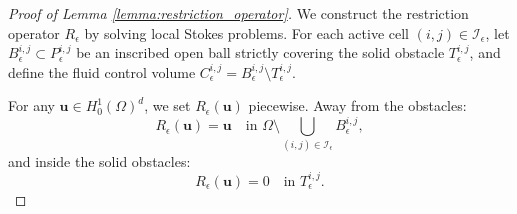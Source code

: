 \documentclass{elsarticle}
\begin{document}
\begin{proof}[Proof of Lemma \ref{lemma:restriction_operator}]
    We construct the restriction operator $R_{\epsilon}$ by solving local Stokes problems. For each active cell $(i,j) \in \mathcal{I}_{\epsilon}$, let $B_{\epsilon}^{i,j} \subset P_\epsilon^{i,j}$ be an inscribed open ball strictly covering the solid obstacle $T_{\epsilon}^{i,j}$, and define the fluid control volume $C_{\epsilon}^{i,j} = B_{\epsilon}^{i,j} \setminus T_{\epsilon}^{i,j}$.

    For any $\mathbf{u} \in H_0^1(\Omega)^d$, we set $R_{\epsilon}(\mathbf{u})$ piecewise. Away from the obstacles:
    \begin{equation}
        R_{\epsilon}(\mathbf{u}) = \mathbf{u} \quad \text{in } \Omega \setminus \bigcup_{(i,j) \in \mathcal{I}_{\epsilon}} B_{\epsilon}^{i,j},
    \end{equation}
    and inside the solid obstacles:
    \begin{equation}
        R_{\epsilon}(\mathbf{u}) = 0 \quad \text{in } T_{\epsilon}^{i,j}.
    \end{equation}


\end{proof}
\end{document}
